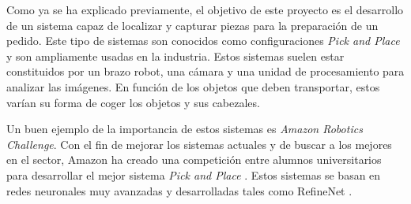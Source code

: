 Como ya se ha explicado previamente, el objetivo de este proyecto es el desarrollo de un sistema capaz de localizar y capturar piezas para la preparación de un pedido. Este tipo de sistemas son conocidos como configuraciones \textit{Pick and Place} y son ampliamente usadas en la industria. Estos sistemas suelen estar constituidos por un brazo robot, una cámara y una unidad de procesamiento para analizar las imágenes. En función de los objetos que deben transportar, estos varían su forma de coger los objetos y sus cabezales.

Un buen ejemplo de la importancia de estos sistemas es \textit{Amazon Robotics Challenge}. Con el fin de mejorar los sistemas actuales y de buscar a los mejores en el sector, Amazon ha creado una competición entre alumnos universitarios para desarrollar el mejor sistema \textit{Pick and Place} \cite{amazon}. Estos sistemas se basan en redes neuronales muy avanzadas y desarrolladas tales como RefineNet \cite{amazon}.
